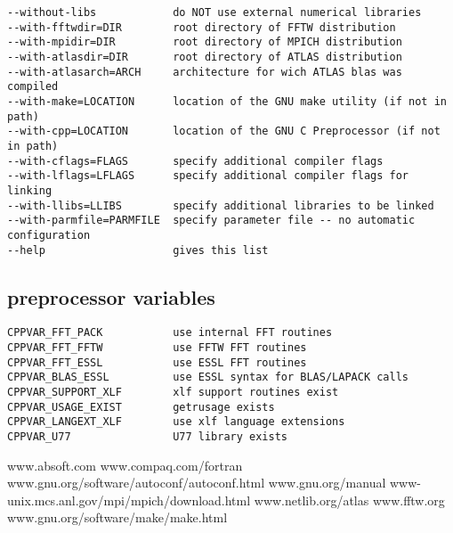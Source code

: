 \documentclass[a4paper,10pt]{article}
\begin{document}
\begin{verbatim}
--without-libs            do NOT use external numerical libraries
--with-fftwdir=DIR        root directory of FFTW distribution
--with-mpidir=DIR         root directory of MPICH distribution
--with-atlasdir=DIR       root directory of ATLAS distribution
--with-atlasarch=ARCH     architecture for wich ATLAS blas was compiled 
--with-make=LOCATION      location of the GNU make utility (if not in path)
--with-cpp=LOCATION       location of the GNU C Preprocessor (if not in path)
--with-cflags=FLAGS       specify additional compiler flags
--with-lflags=LFLAGS      specify additional compiler flags for linking
--with-llibs=LLIBS        specify additional libraries to be linked
--with-parmfile=PARMFILE  specify parameter file -- no automatic configuration
--help                    gives this list
\end{verbatim}

\subsection*{preprocessor variables}

\begin{verbatim}
CPPVAR_FFT_PACK           use internal FFT routines
CPPVAR_FFT_FFTW           use FFTW FFT routines
CPPVAR_FFT_ESSL           use ESSL FFT routines
CPPVAR_BLAS_ESSL          use ESSL syntax for BLAS/LAPACK calls 
CPPVAR_SUPPORT_XLF        xlf support routines exist 
CPPVAR_USAGE_EXIST        getrusage exists
CPPVAR_LANGEXT_XLF        use xlf language extensions
CPPVAR_U77                U77 library exists
\end{verbatim}


\begin{thebibliography}{99}
 www.absoft.com
 www.compaq.com/fortran
 www.gnu.org/software/autoconf/autoconf.html
 www.gnu.org/manual
 www-unix.mcs.anl.gov/mpi/mpich/download.html
 www.netlib.org/atlas
 www.fftw.org
 www.gnu.org/software/make/make.html
\end{thebibliography}
\end{document}
